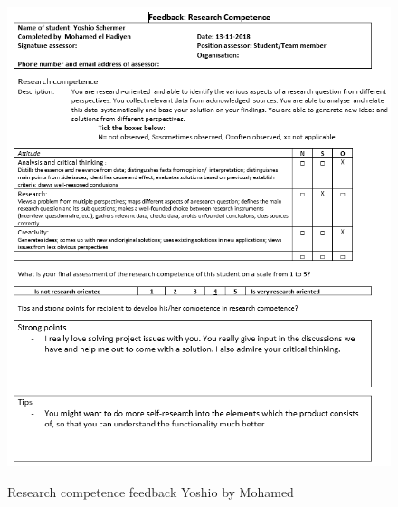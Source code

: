\documentclass[12pt]{article}
\begin{document}
	\begin{figure}[p!]
		\centering
		\includegraphics[width=\columnwidth]{ResSklYoshio1.PNG}\\
		\caption{Research competence feedback Yoshio by Mohamed}
	\end{figure}
\end{document}
